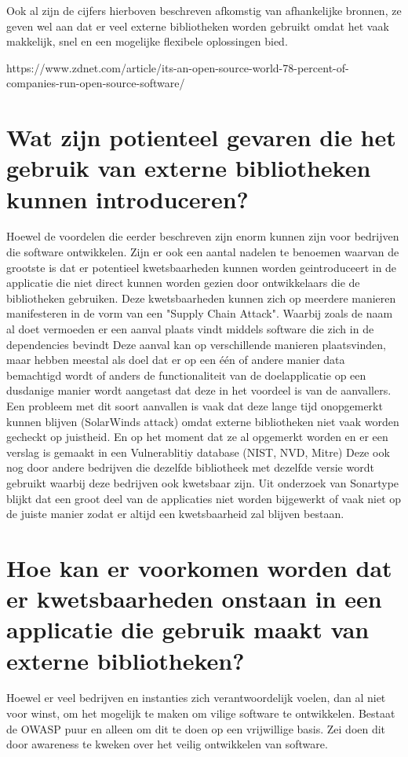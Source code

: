 Ook al zijn de cijfers hierboven beschreven afkomstig van afhankelijke bronnen, ze geven wel aan dat er veel externe bibliotheken worden gebruikt omdat het vaak makkelijk, snel en een mogelijke flexibele oplossingen bied.

https://www.zdnet.com/article/its-an-open-source-world-78-percent-of-companies-run-open-source-software/

\section{Wat zijn potienteel gevaren die het gebruik van externe bibliotheken kunnen introduceren?}\label{sec:wat-zijn-potienteel-gevaren-die-het-gebruik-van-externe-bibliotheken-kunnen-introduceren?}
Hoewel de voordelen die eerder beschreven zijn enorm kunnen zijn voor bedrijven die software ontwikkelen. Zijn er ook een aantal nadelen te benoemen waarvan de grootste is dat er potentieel kwetsbaarheden kunnen worden geintroduceert in de applicatie die niet direct kunnen worden gezien door ontwikkelaars die de bibliotheken gebruiken. Deze kwetsbaarheden kunnen zich op meerdere manieren manifesteren in de vorm van een "Supply Chain Attack". Waarbij zoals de naam al doet vermoeden er een aanval plaats vindt middels software die zich in de dependencies bevindt Deze aanval kan op verschillende manieren plaatsvinden, maar hebben meestal als doel dat er op een één of andere manier data bemachtigd wordt of anders de functionaliteit van de doelapplicatie op een dusdanige manier wordt aangetast dat deze in het voordeel is van de aanvallers. Een probleem met dit soort aanvallen is vaak dat deze lange tijd onopgemerkt kunnen blijven (SolarWinds attack) omdat externe bibliotheken niet vaak worden gecheckt op juistheid. En op het moment dat ze al opgemerkt worden en er een verslag is gemaakt in een Vulnerablitiy database (NIST, NVD, Mitre) Deze ook nog door andere bedrijven die dezelfde bibliotheek met dezelfde versie wordt gebruikt waarbij deze bedrijven ook kwetsbaar zijn. Uit onderzoek van Sonartype blijkt dat een groot deel van de applicaties niet worden bijgewerkt of vaak niet op de juiste manier zodat er altijd een kwetsbaarheid zal blijven bestaan.

\section{Hoe kan er voorkomen worden dat er kwetsbaarheden onstaan in een applicatie die gebruik maakt van externe bibliotheken?}\label{sec:hoe-kan-er-voorkomen-worden-dat-er-kkwetsbaarheden-onstaan-in-een-applicatie-die-gebruik-maakt-van-externe-bibliotheken?}
Hoewel er veel bedrijven en instanties zich verantwoordelijk voelen, dan al niet voor winst, om het mogelijk te maken om vilige software te ontwikkelen. Bestaat de OWASP puur en alleen om dit te doen op een vrijwillige basis. Zei doen dit door awareness te kweken over het veilig ontwikkelen van software.

